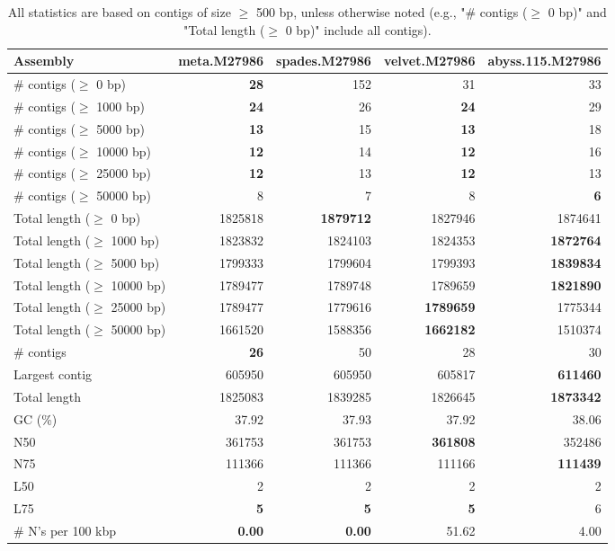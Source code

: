 \documentclass[12pt,a4paper]{article}
\begin{document}
\begin{table}[ht]
\begin{center}
\caption{All statistics are based on contigs of size $\geq$ 500 bp, unless otherwise noted (e.g., "\# contigs ($\geq$ 0 bp)" and "Total length ($\geq$ 0 bp)" include all contigs).}
\begin{tabular}{|l*{4}{|r}|}
\hline
Assembly & meta.M27986 & spades.M27986 & velvet.M27986 & abyss.115.M27986 \\ \hline
\# contigs ($\geq$ 0 bp) & {\bf 28} & 152 & 31 & 33 \\ \hline
\# contigs ($\geq$ 1000 bp) & {\bf 24} & 26 & {\bf 24} & 29 \\ \hline
\# contigs ($\geq$ 5000 bp) & {\bf 13} & 15 & {\bf 13} & 18 \\ \hline
\# contigs ($\geq$ 10000 bp) & {\bf 12} & 14 & {\bf 12} & 16 \\ \hline
\# contigs ($\geq$ 25000 bp) & {\bf 12} & 13 & {\bf 12} & 13 \\ \hline
\# contigs ($\geq$ 50000 bp) & 8 & 7 & 8 & {\bf 6} \\ \hline
Total length ($\geq$ 0 bp) & 1825818 & {\bf 1879712} & 1827946 & 1874641 \\ \hline
Total length ($\geq$ 1000 bp) & 1823832 & 1824103 & 1824353 & {\bf 1872764} \\ \hline
Total length ($\geq$ 5000 bp) & 1799333 & 1799604 & 1799393 & {\bf 1839834} \\ \hline
Total length ($\geq$ 10000 bp) & 1789477 & 1789748 & 1789659 & {\bf 1821890} \\ \hline
Total length ($\geq$ 25000 bp) & 1789477 & 1779616 & {\bf 1789659} & 1775344 \\ \hline
Total length ($\geq$ 50000 bp) & 1661520 & 1588356 & {\bf 1662182} & 1510374 \\ \hline
\# contigs & {\bf 26} & 50 & 28 & 30 \\ \hline
Largest contig & 605950 & 605950 & 605817 & {\bf 611460} \\ \hline
Total length & 1825083 & 1839285 & 1826645 & {\bf 1873342} \\ \hline
GC (\%) & 37.92 & 37.93 & 37.92 & 38.06 \\ \hline
N50 & 361753 & 361753 & {\bf 361808} & 352486 \\ \hline
N75 & 111366 & 111366 & 111166 & {\bf 111439} \\ \hline
L50 & 2 & 2 & 2 & 2 \\ \hline
L75 & {\bf 5} & {\bf 5} & {\bf 5} & 6 \\ \hline
\# N's per 100 kbp & {\bf 0.00} & {\bf 0.00} & 51.62 & 4.00 \\ \hline
\end{tabular}
\end{center}
\end{table}
\end{document}
